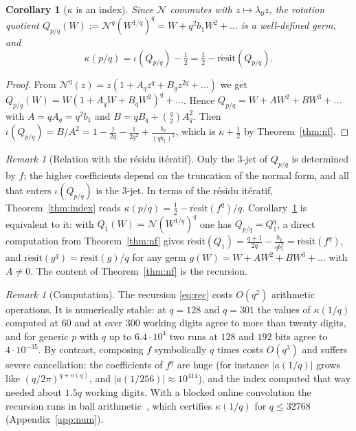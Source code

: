 \documentclass[11pt]{amsart}
\newtheorem{corollary}[theorem]{Corollary}
\theoremstyle{definition}
\theoremstyle{remark}
\newtheorem{remark}[theorem]{Remark}
\newcommand{\NF}{\mathcal{N}}
\newcommand{\resit}{\operatorname{r\acute{e}sit}}
\begin{document}
\begin{corollary}[$\kappa$ is an index]\label{cor:quotient}
Since $\NF$ commutes with $z\mapsto\lambda_0z$, the rotation quotient $Q_{p/q}(W):=\NF^q(W^{1/q})^q=W+q^2b_1W^2+\dots$ is a well-defined germ, and
\[
\kappa(p/q)=\iota(Q_{p/q})-\tfrac12=\tfrac12-\resit(Q_{p/q}).
\]
\end{corollary}

\begin{proof}
From $\NF^q(z)=z(1+A_qz^q+B_qz^{2q}+\dots)$ we get $Q_{p/q}(W)=W(1+A_qW+B_qW^2)^q+\dots$. Hence $Q_{p/q}=W+AW^2+BW^3+\dots$ with $A=qA_q=q^2b_1$ and $B=qB_q+\binom q2A_q^2$. Then $\iota(Q_{p/q})=B/A^2=1-\frac1{2q}-\frac1{2q^2}+\frac{b_2}{(qb_1)^2}$, which is $\kappa+\frac12$ by Theorem~\ref{thm:nf}.
\end{proof}

\begin{remark}[Relation with the r\'esidu it\'eratif]\label{rem:resit}
Only the $3$-jet of $Q_{p/q}$ is determined by $f$; the higher coefficients depend on the truncation of the normal form, and all that enters $\iota(Q_{p/q})$ is the $3$-jet. In terms of the r\'esidu it\'eratif, Theorem~\ref{thm:index} reads $\kappa(p/q)=\frac12-\resit(f^q)/q$. Corollary~\ref{cor:quotient} is equivalent to it: with $Q_1(W)=\NF(W^{1/q})^q$ one has $Q_{p/q}=Q_1^q$, a direct computation from Theorem~\ref{thm:nf} gives $\resit(Q_1)=\frac{q+1}{2q}-\frac{b_2}{qb_1^2}=\resit(f^q)$, and $\resit(g^q)=\resit(g)/q$ for any germ $g(W)=W+AW^2+BW^3+\dots$ with $A\ne0$. The content of Theorem~\ref{thm:nf} is the recursion.
\end{remark}

\begin{remark}[Computation]\label{rem:computation}
The recursion \eqref{eq:rec} costs $O(q^2)$ arithmetic operations. It is numerically stable: at $q=128$ and $q=301$ the values of $\kappa(1/q)$ computed at $60$ and at over $300$ working digits agree to more than twenty digits, and for generic $p$ with $q$ up to $6.4\cdot10^4$ two runs at $128$ and $192$ bits agree to $4\cdot10^{-35}$. By contrast, composing $f$ symbolically $q$ times costs $O(q^3)$ and suffers severe cancellation: the coefficients of $f^q$ are huge (for instance $|a(1/q)|$ grows like $(q/2\pi)^{q+o(q)}$, and $|a(1/256)|\approx10^{414}$), and the index computed that way needed about $1.5q$ working digits. With a blocked online convolution the recursion runs in ball arithmetic~\cite{Arb}, which certifies $\kappa(1/q)$ for $q\le32768$ (Appendix~\ref{app:num}).
\end{remark}
\end{document}
